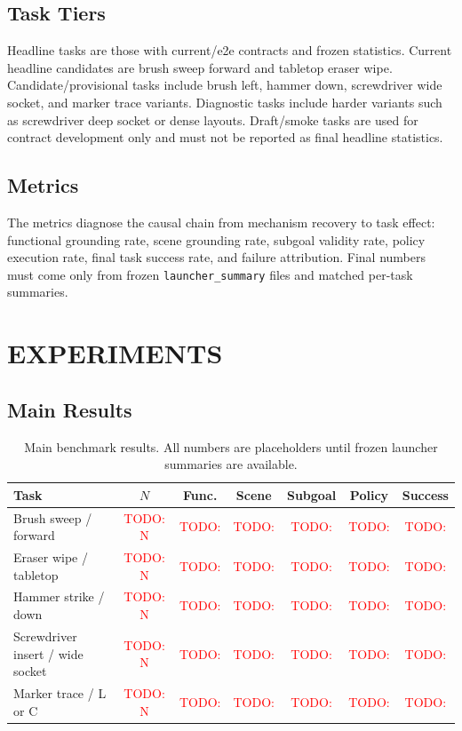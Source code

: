 \documentclass[letterpaper, 10 pt, conference]{ieeeconf}
\newcommand{\todo}[1]{\textcolor{red}{TODO: #1}}
\begin{document}
\subsection{Task Tiers}
Headline tasks are those with current/e2e contracts and frozen statistics.
Current headline candidates are brush sweep forward and tabletop eraser wipe.
Candidate/provisional tasks include brush left, hammer down, screwdriver wide
socket, and marker trace variants. Diagnostic tasks include harder variants
such as screwdriver deep socket or dense layouts. Draft/smoke tasks are used
for contract development only and must not be reported as final headline
statistics.

\subsection{Metrics}
The metrics diagnose the causal chain from mechanism recovery to task effect:
functional grounding rate, scene grounding rate, subgoal validity rate, policy
execution rate, final task success rate, and failure attribution. Final numbers
must come only from frozen \texttt{launcher\_summary} files and matched
per-task summaries.

\section{EXPERIMENTS}

\subsection{Main Results}
\begin{table}[t]
\caption{Main benchmark results. All numbers are placeholders until frozen
launcher summaries are available.}
\label{tab:main_results}
\begin{center}
\begin{tabular}{lcccccc}
\toprule
Task & $N$ & Func. & Scene & Subgoal & Policy & Success \\
\midrule
Brush sweep / forward & \todo{N} & \todo{} & \todo{} & \todo{} & \todo{} & \todo{} \\
Eraser wipe / tabletop & \todo{N} & \todo{} & \todo{} & \todo{} & \todo{} & \todo{} \\
Hammer strike / down & \todo{N} & \todo{} & \todo{} & \todo{} & \todo{} & \todo{} \\
Screwdriver insert / wide socket & \todo{N} & \todo{} & \todo{} & \todo{} & \todo{} & \todo{} \\
Marker trace / L or C & \todo{N} & \todo{} & \todo{} & \todo{} & \todo{} & \todo{} \\
\bottomrule
\end{tabular}
\end{center}
\end{table}
\end{document}
